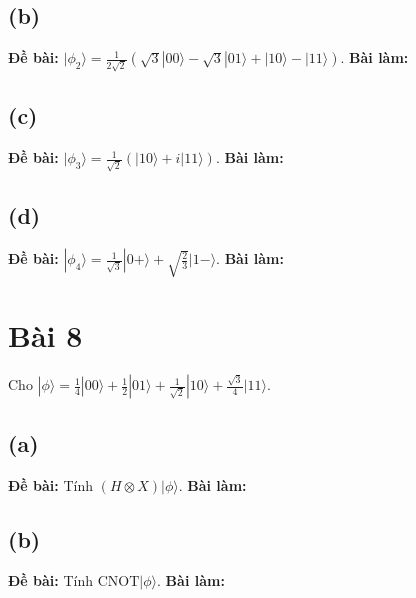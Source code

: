 \subsection{(b)}
\textbf{Đề bài:} $|\phi_{2}\rangle=\frac{1}{2\sqrt{2}}(\sqrt{3}|00\rangle-\sqrt{3}|01\rangle+|10\rangle-|11\rangle)$.
\textbf{Bài làm:}

\subsection{(c)}
\textbf{Đề bài:} $|\phi_{3}\rangle=\frac{1}{\sqrt{2}}(|10\rangle+i|11\rangle)$.
\textbf{Bài làm:}

\subsection{(d)}
\textbf{Đề bài:} $|\phi_{4}\rangle=\frac{1}{\sqrt{3}}|0+\rangle+\sqrt{\frac{2}{3}}|1-\rangle$.
\textbf{Bài làm:}

\section{Bài 8}
Cho $|\phi\rangle=\frac{1}{4}|00\rangle+\frac{1}{2}|01\rangle+\frac{1}{\sqrt{2}}|10\rangle+\frac{\sqrt{3}}{4}|11\rangle$.

\subsection{(a)}
\textbf{Đề bài:} Tính $(H\otimes X)|\phi\rangle$.
\textbf{Bài làm:}

\subsection{(b)}
\textbf{Đề bài:} Tính $\mathrm{CNOT}|\phi\rangle$.
\textbf{Bài làm:}